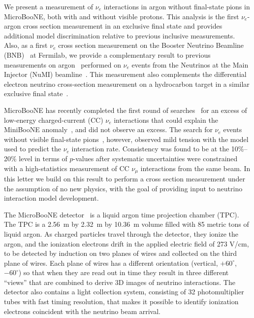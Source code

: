 \documentclass[reprint,
 amsmath,amssymb,
 aps,prd,
 superscriptaddress,
 twocolumn, longbibliography
]{revtex4-1}
\newcommand{\nue}{$\nu_e$\xspace}
\newcommand{\numu}{$\nu_{\mu}$\xspace}
\begin{document}
We present a measurement of \nue interactions in argon without final-state pions in MicroBooNE, both with and without visible protons. This analysis is the first \nue-argon cross section measurement in an exclusive final state and provides additional model discrimination relative to previous inclusive measurements. Also, as a first \nue cross section measurement on the Booster Neutrino Beamline (BNB)~\cite{BNB} at Fermilab, we provide a complementary result to previous measurements on argon~\cite{argoneutnue,ubnuminue,ubnuminueMCC9} performed on \nue events from the Neutrinos at the Main Injector (NuMI) beamline~\cite{numibeam}. This measurement also complements the differential electron neutrino cross-section measurement on a hydrocarbon target in a similar exclusive final state~\cite{MINERvA:2015jih}.

MicroBooNE has recently completed the first round of searches~\cite{eLEEPRL,PeLEE,DLPRD,WCPRD} for an excess of low-energy charged-current (CC) \nue interactions that could explain the MiniBooNE anomaly~\cite{MiniBooNE2020}, and did not observe an excess. The search for \nue events without visible final-state pions~\cite{PeLEE}, however, observed mild tension with the model used to predict the \nue interaction rate. Consistency was found to be at the 10\%--20\% level in terms of $p$-values after systematic uncertainties were constrained with a high-statistics measurement of CC \numu interactions from the same beam. 
In this letter we build on this result to perform a cross section measurement under the assumption of no new physics, with the goal of providing input to neutrino interaction model development.

The MicroBooNE detector~\cite{ubdetector} is a liquid argon time projection chamber (TPC).  The TPC is a 2.56~m by 2.32~m by 10.36~m volume filled with 85 metric tons of liquid argon.  As charged particles travel through the detector, they ionize the argon, and the ionization electrons drift in the applied electric field of 273 V/cm, to be detected by induction on two planes of wires and collected on the third plane of wires.  Each plane of wires has a different orientation (vertical, $+60^{\circ}$, $-60^{\circ}$) so that when they are read out in time they result in three different ``views'' that are combined to derive 3D images of neutrino interactions.
The detector also contains a light collection system, consisting of 32 photomultiplier tubes with fast timing resolution, that makes it possible to identify ionization electrons coincident with the neutrino beam arrival.
\end{document}
